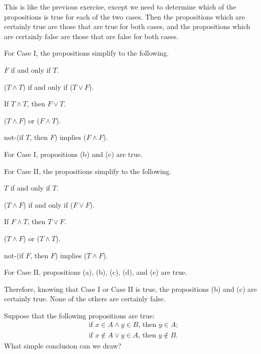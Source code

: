 \begin{solution}
This is like the previous exercise, except we need to determine which of the propositions is true
for each of the two cases. Then the propositions which are certainly true are those that are true for both cases,
and the propositions which are certainly false are those that are false for both cases.

For Case I, the propositions simplify to the following.

\begin{enumalpha}
    \item $F$ if and only if $T$.
    \item ($T\land T$) if and only if ($T\lor F$).
    \item If $T\land T$, then $F\lor T$.
    \item ($T\land F$) or ($F\land T$).
    \item not-(if $T$, then $F$) implies ($F\land F$).
\end{enumalpha}

For Case I, propositions (b) and (c) are true.

For Case II, the propositions simplify to the following.

\begin{enumalpha}
    \item $T$ if and only if $T$.
    \item ($T\land F$) if and only if ($F\lor F$).
    \item If $F\land T$, then $T\lor F$.
    \item ($T\land F$) or ($T\land T$).
    \item not-(if $F$, then $F$) implies ($T\land F$).
\end{enumalpha}

For Case II, propositions (a), (b), (c), (d), and (e) are true.

Therefore, knowing that Case I or Case II is true,
the propositions (b) and (c) are certainly true. None of the others are certainly false.
\end{solution}

\begin{exercise}
Suppose that the following propositions are true:
\begin{align*}
    &\text{if $x\in A\land y\in B$, then $y\in A$;}\\
    &\text{if $x\nin A\lor y\in A$, then $y\nin B$.}
\end{align*}
What simple conclusion can we draw?
\end{exercise}

